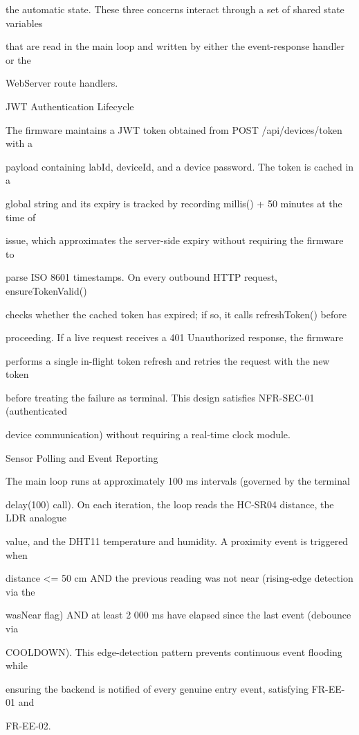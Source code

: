 the automatic state. These three concerns interact through a set of shared state variables

that are read in the main loop and written by either the event-response handler or the

WebServer route handlers.

JWT Authentication Lifecycle

The firmware maintains a JWT token obtained from POST /api/devices/token with a

payload containing labId, deviceId, and a device password. The token is cached in a

global string and its expiry is tracked by recording millis() + 50 minutes at the time of

issue, which approximates the server-side expiry without requiring the firmware to

parse ISO 8601 timestamps. On every outbound HTTP request, ensureTokenValid()

checks whether the cached token has expired; if so, it calls refreshToken() before

proceeding. If a live request receives a 401 Unauthorized response, the firmware

performs a single in-flight token refresh and retries the request with the new token

before treating the failure as terminal. This design satisfies NFR-SEC-01 (authenticated

device communication) without requiring a real-time clock module.

Sensor Polling and Event Reporting

The main loop runs at approximately 100 ms intervals (governed by the terminal

delay(100) call). On each iteration, the loop reads the HC-SR04 distance, the LDR analogue

value, and the DHT11 temperature and humidity. A proximity event is triggered when

distance <= 50 cm AND the previous reading was not near (rising-edge detection via the

wasNear flag) AND at least 2 000 ms have elapsed since the last event (debounce via

COOLDOWN). This edge-detection pattern prevents continuous event flooding while

ensuring the backend is notified of every genuine entry event, satisfying FR-EE-01 and

FR-EE-02.

